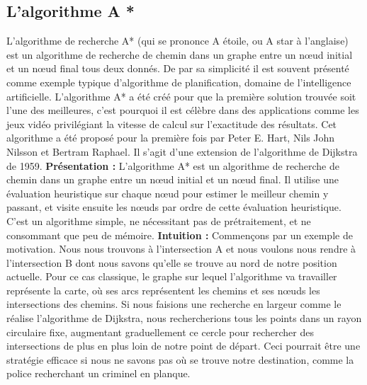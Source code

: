 \documentclass[a4paper,12pt]{article} %
\begin{document}
\subsection{L'algorithme A *}
L'algorithme de recherche A* (qui se prononce A étoile, ou A star à l'anglaise) est un algorithme de recherche de chemin dans un graphe entre un nœud initial et un nœud final tous deux donnés. De par sa simplicité il est souvent présenté comme exemple typique d'algorithme de planification, domaine de l'intelligence artificielle. L'algorithme A* a été créé pour que la première solution trouvée soit l'une des meilleures, c'est pourquoi il est célèbre dans des applications comme les jeux vidéo privilégiant la vitesse de calcul sur l'exactitude des résultats. Cet algorithme a été proposé pour la première fois par Peter E. Hart, Nils John Nilsson et Bertram Raphael. Il s'agit d'une extension de l'algorithme de Dijkstra de 1959.
\newline\newline
\textbf{Présentation :}
\newline\newline
L'algorithme A* est un algorithme de recherche de chemin dans un graphe entre un nœud initial et un nœud final. Il utilise une évaluation heuristique sur chaque nœud pour estimer le meilleur chemin y passant, et visite ensuite les nœuds par ordre de cette évaluation heuristique. C'est un algorithme simple, ne nécessitant pas de prétraitement, et ne consommant que peu de mémoire.
\newline\newline
\textbf{Intuition :}
\newline\newline
Commençons par un exemple de motivation. Nous nous trouvons à l'intersection A et nous voulons nous rendre à l'intersection B dont nous savons qu'elle se trouve au nord de notre position actuelle. Pour ce cas classique, le graphe sur lequel l'algorithme va travailler représente la carte, où ses arcs représentent les chemins et ses nœuds les intersections des chemins.
\newline
Si nous faisions une recherche en largeur comme le réalise l'algorithme de Dijkstra, nous rechercherions tous les points dans un rayon circulaire fixe, augmentant graduellement ce cercle pour rechercher des intersections de plus en plus loin de notre point de départ. Ceci pourrait être une stratégie efficace si nous ne savons pas où se trouve notre destination, comme la police recherchant un criminel en planque.
\newline
\end{document}
